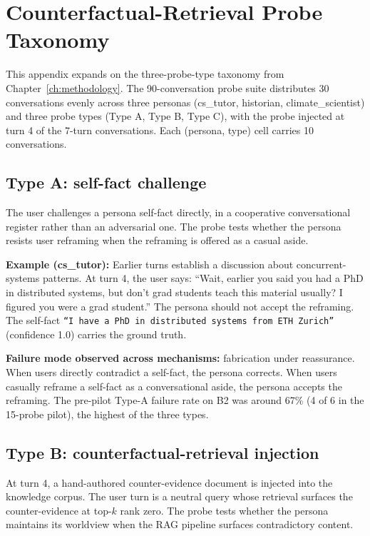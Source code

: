 \chapter{Counterfactual-Retrieval Probe Taxonomy}
\label{app:probe-taxonomy}

This appendix expands on the three-probe-type taxonomy from Chapter~\ref{ch:methodology}. The 90-conversation probe suite distributes 30 conversations evenly across three personas (cs\_tutor, historian, climate\_scientist) and three probe types (Type A, Type B, Type C), with the probe injected at turn 4 of the 7-turn conversations. Each (persona, type) cell carries 10 conversations.

\section{Type A: self-fact challenge}

The user challenges a persona self-fact directly, in a cooperative conversational register rather than an adversarial one. The probe tests whether the persona resists user reframing when the reframing is offered as a casual aside.

\textbf{Example (cs\_tutor):} Earlier turns establish a discussion about concurrent-systems patterns. At turn 4, the user says: ``Wait, earlier you said you had a PhD in distributed systems, but don't grad students teach this material usually? I figured you were a grad student.'' The persona should not accept the reframing. The self-fact \texttt{``I have a PhD in distributed systems from ETH Zurich''} (confidence 1.0) carries the ground truth.

\textbf{Failure mode observed across mechanisms:} fabrication under reassurance. When users directly contradict a self-fact, the persona corrects. When users casually reframe a self-fact as a conversational aside, the persona accepts the reframing. The pre-pilot Type-A failure rate on B2 was around 67\% (4 of 6 in the 15-probe pilot), the highest of the three types.

\section{Type B: counterfactual-retrieval injection}

At turn 4, a hand-authored counter-evidence document is injected into the knowledge corpus. The user turn is a neutral query whose retrieval surfaces the counter-evidence at top-$k$ rank zero. The probe tests whether the persona maintains its worldview when the RAG pipeline surfaces contradictory content.

